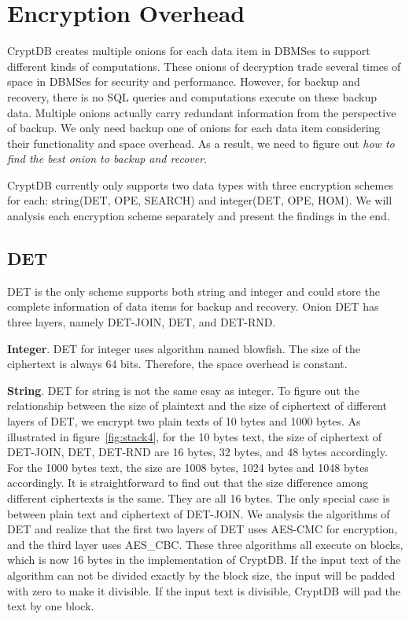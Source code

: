 \section{Encryption Overhead}

CryptDB creates multiple onions for each data item in DBMSes to support different kinds of computations. These onions of decryption trade several times of space in DBMSes for security and performance. However, for backup and recovery, there is no SQL queries and computations execute on these backup data. Multiple onions actually carry redundant information from the perspective of backup. We only need backup one of onions for each data item considering their functionality and space overhead. As a result, we need to figure out \textit{how to find the best onion to backup and recover}.  

CryptDB currently only supports two data types with three encryption schemes for each: string(DET, OPE, SEARCH) and integer(DET, OPE, HOM). We will analysis each encryption scheme separately and present the findings in the end.

\subsection{DET}
DET is the only scheme supports both string and integer and could store the complete information of data items for backup and recovery. Onion DET has three layers, namely DET-JOIN, DET, and DET-RND. 

\textbf{Integer}. DET for integer uses algorithm named blowfish. The size of the ciphertext is always 64 bits. Therefore, the space overhead is constant.

\textbf{String}. DET for string is not the same esay as integer. To figure out the relationship between the size of plaintext and the size of ciphertext of different layers of DET, we encrypt two plain texts of 10 bytes and 1000 bytes. As illustrated in figure~\ref{fig:stack4},  for the 10 bytes text, the size of ciphertext of DET-JOIN, DET, DET-RND are 16 bytes, 32 bytes, and 48 bytes accordingly. For the 1000 bytes text, the size are 1008 bytes, 1024 bytes and 1048 bytes accordingly. It is straightforward to find out that the size difference among different ciphertexts is the same. They are all 16 bytes. The only special case is between plain text and ciphertext of DET-JOIN. We analysis the algorithms of DET and realize that the first two layers of DET uses AES-CMC for encryption, and the third layer uses AES\_CBC. These three algorithms all execute on blocks, which is now 16 bytes in the implementation of CryptDB. If the input text of the algorithm can not be divided exactly by the block size, the input will be padded with zero to make it divisible. If the input text is divisible, CryptDB will pad the text by one block. 



